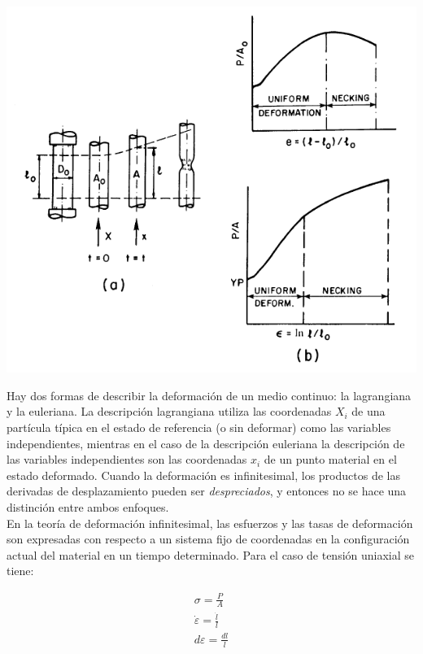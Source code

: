 \begin{center}
\includegraphics[scale=0.8]{src/ch2/tensile_test.png}
\label{fig:tensile_test}
\end{center}

Hay dos formas de describir la deformación de un medio continuo: la lagrangiana y la euleriana. 
La descripción lagrangiana utiliza las coordenadas $X_i$ de una partícula típica en el estado 
de referencia (o sin deformar) como las variables independientes, mientras en el caso 
de la descripción euleriana la descripción de las variables independientes son las coordenadas 
$x_i$ de un punto material en el estado deformado. Cuando la deformación es infinitesimal, los 
productos de las derivadas de desplazamiento pueden ser \textit{despreciados}, y entonces no 
se hace una distinción entre ambos enfoques. ~\cite{kobayashi1989} \\

En la teoría de deformación infinitesimal, las esfuerzos y las tasas de deformación son expresadas 
con respecto a un sistema fijo de coordenadas en la configuración actual del material en 
un tiempo determinado. Para el caso de tensión uniaxial se tiene: ~\cite{kobayashi1989}

\begin{align}
\sigma = \frac{P}{A} \\
\dot{\varepsilon} = \frac{\dot{l}}{l} \\
d\varepsilon = \frac{dl}{l}
\end{align}

